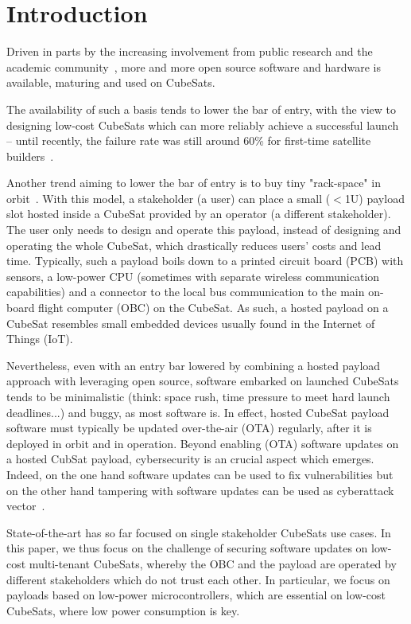\section{Introduction}
\label{sec:introduction}

Driven in parts by the increasing involvement from public research and the academic community~\cite{cubesat101}, more and more open source software and hardware is available, maturing and used on CubeSats.

The availability of such a basis tends to lower the bar of entry, with the view to designing low-cost CubeSats which can more reliably achieve a successful launch -- until recently, the failure
rate was still around 60\% for first-time satellite builders~\cite{Holliday2019PyCubed}.

Another trend aiming to lower the bar of entry is to buy tiny "rack-space" in orbit~\cite{satrevolution2020}.
With this model, a stakeholder (a user) can place a small ($<$1U) payload slot hosted inside a CubeSat provided by an operator (a different stakeholder).
The user only needs to design and operate this payload, instead of designing and operating the whole CubeSat, which drastically reduces users' costs and lead time.
Typically, such a payload boils down to a printed circuit board (PCB) with sensors, a low-power CPU (sometimes with separate wireless communication capabilities) and a connector to the local bus communication to the main on-board flight computer (OBC) on the CubeSat.
As such, a hosted payload on a CubeSat resembles small embedded devices usually found in the Internet of Things (IoT).

Nevertheless, even with an entry bar lowered by combining a hosted payload approach with leveraging open source, software embarked on launched CubeSats tends to be minimalistic (think: space rush, time pressure to meet hard launch deadlines...) and buggy, as most software is. In effect, hosted CubeSat payload software must typically be updated over-the-air (OTA) regularly, after it is deployed in orbit and in operation. Beyond enabling (OTA) software updates on a hosted CubSat payload, cybersecurity is an crucial aspect which emerges. Indeed, on the one hand software updates can  be used to fix vulnerabilities but on the other hand tampering with software updates can be used as cyberattack vector~\cite{ccleaner}.

State-of-the-art has so far focused on single stakeholder CubeSats use cases. In this paper, we thus focus on the challenge of securing software updates on low-cost multi-tenant CubeSats, whereby the OBC and the payload are operated by different stakeholders which do not trust each other. 
In particular, we focus on payloads based on low-power microcontrollers, which are essential on low-cost CubeSats, where low power consumption is key.





